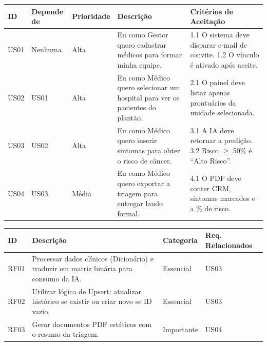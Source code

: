 \documentclass{article}
\begin{document}
\begin{tabular}{|l|l|l|p{6cm}|p{6cm}|}
\hline
\textbf{ID} & \textbf{Depende de} & \textbf{Prioridade} & \textbf{Descrição} & \textbf{Critérios de Aceitação} \\
\hline
US01 & Nenhuma & Alta & Eu como Gestor quero cadastrar médicos para formar minha equipe. & 1.1 O sistema deve disparar e-mail de convite. 1.2 O vínculo é ativado após aceite. \\
\hline
US02 & US01 & Alta & Eu como Médico quero selecionar um hospital para ver os pacientes do plantão. & 2.1 O painel deve listar apenas prontuários da unidade selecionada. \\
\hline
US03 & US02 & Alta & Eu como Médico quero inserir sintomas para obter o risco de câncer. & 3.1 A IA deve retornar a predição. 3.2 Risco $\geq$ 50\% é ``Alto Risco''. \\
\hline
US04 & US03 & Média & Eu como Médico quero exportar a triagem para entregar laudo formal. & 4.1 O PDF deve conter CRM, sintomas marcados e a \% de risco. \\
\hline
\end{tabular}

\vspace{0.5cm}

\begin{tabular}{|l|p{8cm}|l|l|}
\hline
\textbf{ID} & \textbf{Descrição} & \textbf{Categoria} & \textbf{Req. Relacionados} \\
\hline
RF01 & Processar dados clínicos (Dicionário) e traduzir em matriz binária para consumo da IA. & Essencial & US03 \\
\hline
RF02 & Utilizar lógica de Upsert: atualizar histórico se existir ou criar novo se ID vazio. & Essencial & US03 \\
\hline
RF03 & Gerar documentos PDF estáticos com o resumo da triagem. & Importante & US04 \\
\hline
\end{tabular}
\end{document}
